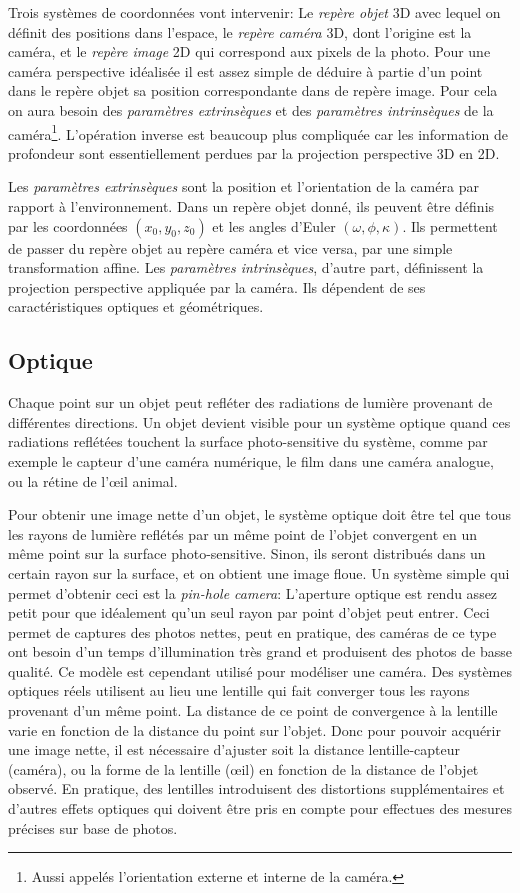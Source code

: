 \documentclass[a4paper,10pt]{scrreprt}
\begin{document}
Trois systèmes de coordonnées vont intervenir: Le \emph{repère objet} 3D avec lequel on définit des positions dans l'espace, le \emph{repère caméra} 3D, dont l'origine est la caméra, et le \emph{repère image} 2D qui correspond aux pixels de la photo. Pour une caméra perspective idéalisée il est assez simple de déduire à partie d'un point dans le repère objet sa position correspondante dans de repère image. Pour cela on aura besoin des \emph{paramètres extrinsèques} et des \emph{paramètres intrinsèques} de la caméra\footnote{Aussi appelés l'orientation externe et interne de la caméra.}. L'opération inverse est beaucoup plus compliquée car les information de profondeur sont essentiellement perdues par la projection perspective 3D en 2D.

Les \emph{paramètres extrinsèques} sont la position et l'orientation de la caméra par rapport à l'environnement. Dans un repère objet donné, ils peuvent être définis par les coordonnées $(x_0, y_0, z_0)$ et les angles d'Euler $(\omega, \phi, \kappa)$. Ils permettent de passer du repère objet au repère caméra et vice versa, par une simple transformation affine. Les \emph{paramètres intrinsèques}, d'autre part, définissent la projection perspective appliquée par la caméra. Ils dépendent de ses caractéristiques optiques et géométriques. 

\subsection{Optique}
Chaque point sur un objet peut refléter des radiations de lumière provenant de différentes directions. Un objet devient visible pour un système optique quand ces radiations reflétées touchent la surface photo-sensitive du système, comme par exemple le capteur d'une caméra numérique, le film dans une caméra analogue, ou la rétine de l'œil animal.

Pour obtenir une image nette d'un objet, le système optique doit être tel que tous les rayons de lumière reflétés par un même point de l'objet convergent en un même point sur la surface photo-sensitive. Sinon, ils seront distribués dans un certain rayon sur la surface, et on obtient une image floue. Un système simple qui permet d'obtenir ceci est la \emph{pin-hole camera}: L'aperture optique est rendu assez petit pour que idéalement qu'un seul rayon par point d'objet peut entrer. Ceci permet de captures des photos nettes, peut en pratique, des caméras de ce type ont besoin d'un temps d'illumination très grand et produisent des photos de basse qualité. Ce modèle est cependant utilisé pour modéliser une caméra. Des systèmes optiques réels utilisent au lieu une lentille qui fait converger tous les rayons provenant d'un même point. La distance de ce point de convergence à la lentille varie en fonction de la distance du point sur l'objet. Donc pour pouvoir acquérir une image nette, il est nécessaire d'ajuster soit la distance lentille-capteur (caméra), ou la forme de la lentille (œil) en fonction de la distance de l'objet observé. En pratique, des lentilles introduisent des distortions supplémentaires et d'autres effets optiques qui doivent être pris en compte pour effectues des mesures précises sur base de photos. \cite{Truc1998}
\end{document}
